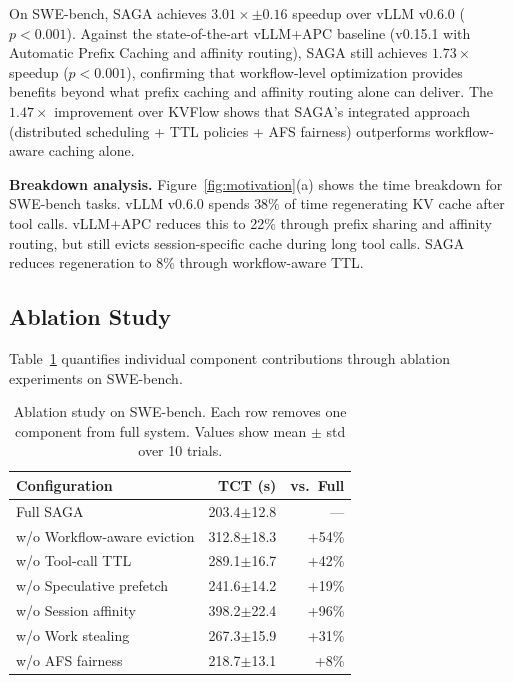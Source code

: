 \documentclass[sigconf]{acmart}
\newcommand{\sysname}{SAGA\xspace}
\begin{document}
On SWE-bench, \sysname achieves $3.01\times \pm 0.16$ speedup over vLLM v0.6.0 ($p < 0.001$). Against the state-of-the-art vLLM+APC baseline (v0.15.1 with Automatic Prefix Caching and affinity routing), \sysname still achieves $1.73\times$ speedup ($p < 0.001$), confirming that workflow-level optimization provides benefits beyond what prefix caching and affinity routing alone can deliver. The $1.47\times$ improvement over KVFlow shows that \sysname's integrated approach (distributed scheduling + TTL policies + AFS fairness) outperforms workflow-aware caching alone.

\textbf{Breakdown analysis.} Figure~\ref{fig:motivation}(a) shows the time breakdown for SWE-bench tasks. vLLM v0.6.0 spends 38\% of time regenerating KV cache after tool calls. vLLM+APC reduces this to 22\% through prefix sharing and affinity routing, but still evicts session-specific cache during long tool calls. \sysname reduces regeneration to 8\% through workflow-aware TTL.

\subsection{Ablation Study}
\label{sec:ablation}

Table~\ref{tab:ablation} quantifies individual component contributions through ablation experiments on SWE-bench.

\begin{table}[t]
    \centering
    \caption{Ablation study on SWE-bench. Each row removes one component from full system. Values show mean $\pm$ std over 10 trials.}
    \label{tab:ablation}
    \begin{tabular}{lrr}
    \toprule
    \textbf{Configuration} & \textbf{TCT (s)} & \textbf{vs.\ Full} \\
    \midrule
    Full \sysname & 203.4\scriptsize{$\pm$12.8} & --- \\
    \quad w/o Workflow-aware eviction & 312.8\scriptsize{$\pm$18.3} & +54\% \\
    \quad w/o Tool-call TTL & 289.1\scriptsize{$\pm$16.7} & +42\% \\
    \quad w/o Speculative prefetch & 241.6\scriptsize{$\pm$14.2} & +19\% \\
    \quad w/o Session affinity & 398.2\scriptsize{$\pm$22.4} & +96\% \\
    \quad w/o Work stealing & 267.3\scriptsize{$\pm$15.9} & +31\% \\
    \quad w/o AFS fairness & 218.7\scriptsize{$\pm$13.1} & +8\% \\
    \bottomrule
    \end{tabular}
\end{table}
\end{document}
